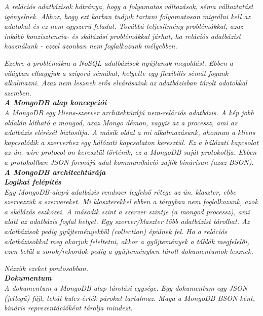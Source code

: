 \textit{A relációs adatbázisok hátránya, hogy a folyamatos változások, séma változtatást igényelnek. Ahhoz, hogy ezt karban tudjuk tartani folyamatosan migrálni kell az adatokat és ez nem egyszerű feladat. Továbbá teljesítmény problémákkal, azaz inkább konzisztencia- és skálázási problémákkal járhat, ha relációs adatbázist használunk - ezzel azonban nem foglalkozunk mélyebben.}

\textit{Ezekre a problémákra a NoSQL adatbázisok nyújtanak megoldást. Ebben a világban elhagyjuk a szigorú sémákat, helyette egy flexibilis sémát fogunk alkalmazni. Azaz nem lesznek erős elvárásaink az adatbázisban tárolt adatokkal szemben.}\\

\noindent\textit{\textbf{A MongoDB alap koncepciói}}\\

\textit{A MongoDB egy kliens-szerver architektúrájú nem-relációs adatbázis. A kép jobb oldalán látható a mongod, azaz Mongo démon, vagyis az a processz, ami az adatbázis elérését biztosítja. A másik oldal a mi alkalmazásunk, ahonnan a kliens kapcsolódik a szerverhez egy hálózati kapcsolaton keresztül. Ez a hálózati kapcsolat az ún. wire protocol-on keresztül történik, ez a MongoDB saját protokollja. Ebben a protokollban JSON formájú adat kommunikáció zajlik binárisan (azaz BSON).}\\

\noindent\textit{\textbf{\large{A MongoDB architechtúrája}}}\\

\noindent\textit{\textbf{Logikai felépítés}}\\

\textit{Egy MongoDB-alapú adatbázis rendszer legfelső rétege az ún. klaszter, ebbe szervezzük a szervereket. Mi klaszterekkel ebben a tárgyban nem foglalkozunk, azok a skálázás eszközei. A második szint a szerver szintje (a mongod processz), ami alatt az adatbázis foglal helyet. Egy szerver/klaszter több adatbázist tárolhat. Az adatbázisok pedig gyűjteményekből (collection) épülnek fel. Ha a relációs adatbázisokkal meg akarjuk feleltetni, akkor a gyűjtemények a táblák megfelelői, ezen belül a sorok/rekordok pedig a gyűjteményben tárolt dokumentumok lesznek.}

\textit{Nézzük ezeket pontosabban.}\\

\noindent\textit{\textbf{Dokumentum}}\\

\textit{A dokumentum a MongoDB alap tárolási egysége. Egy dokumentum egy JSON (jellegű) fájl, tehát kulcs-érték párokat tartalmaz. Maga a MongoDB BSON-ként, bináris reprezentációként tárolja mindezt.}


